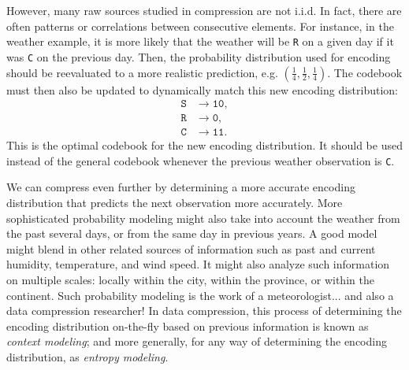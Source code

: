 However, many raw sources studied in compression are not i.i.d.
In fact, there are often patterns or correlations between consecutive elements.
For instance, in the weather example, it is more likely that the weather will be \texttt{R} on a given day if it was \texttt{C} on the previous day.
Then, the probability distribution used for encoding should be reevaluated to a more realistic prediction, e.g. $(\frac{1}{4}, \frac{1}{2}, \frac{1}{4})$.
The codebook must then also be updated to dynamically match this new encoding distribution:
\begin{align*}
  \texttt{S} &\rightarrow \texttt{10}, \\
  \texttt{R} &\rightarrow \texttt{0}, \\
  \texttt{C} &\rightarrow \texttt{11}.
\end{align*}
This is the optimal codebook for the new encoding distribution.
It should be used instead of the general codebook whenever the previous weather observation is \texttt{C}.

We can compress even further by determining a more accurate encoding distribution that predicts the next observation more accurately.
More sophisticated probability modeling might also take into account the weather from the past several days, or from the same day in previous years.
A good model might blend in other related sources of information such as past and current humidity, temperature, and wind speed.
It might also analyze such information on multiple scales: locally within the city, within the province, or within the continent.
Such probability modeling is the work of a meteorologist... and also a data compression researcher!
In data compression, this process of determining the encoding distribution on-the-fly based on previous information is known as \emph{context modeling}; and more generally, for any way of determining the encoding distribution, as \emph{entropy modeling}.







